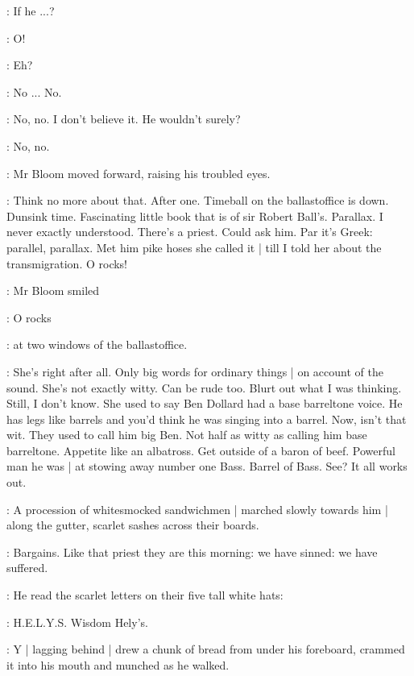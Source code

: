 \BloomInt:
If he ...?

\BloomInt:
O!

\BloomInt:
Eh?

\BloomInt:
No ...
No.

\BloomInt:
No, no.
I don't believe it.
He wouldn't surely?

\BloomInt:
No, no.

:
Mr Bloom moved forward, raising his troubled eyes.

\BloomInt:
Think no more about that.
After one.
Timeball on the ballastoffice is down.
Dunsink time.
Fascinating little book that is of sir Robert Ball's.
Parallax.
I never exactly understood.
There's a priest.
Could ask him.
Par it's Greek:
parallel, parallax.
Met him pike hoses she called it |
till I told her about the transmigration.
O rocks!

:
Mr Bloom smiled

\BloomInt:
O rocks

:
at two windows of the ballastoffice.

\BloomInt:
She's right after all.
Only big words for ordinary things |
on account of the sound.
She's not exactly witty.
Can be rude too.
Blurt out what I was thinking.
Still, I don't know.
She used to say Ben Dollard had a base barreltone voice.
He has legs like barrels and you'd think he was singing into a barrel.
Now, isn't that wit.
They used to call him big Ben.
Not half as witty as calling him base barreltone.
Appetite like an albatross.
Get outside of a baron of beef.
Powerful man he was |
at stowing away number one Bass.
Barrel of Bass.
See?
It all works out.

:
A procession of whitesmocked sandwichmen |
marched slowly towards him |
along the gutter,
scarlet sashes across their boards.

\BloomInt:
Bargains.
Like that priest they are this morning:
we have sinned:
we have suffered.

:
He read the scarlet letters on their five tall white hats:

\BloomInt:
H.E.L.Y.S\@.
Wisdom Hely's.

:
Y |
lagging behind |
drew a chunk of bread from under his foreboard,
crammed it into his mouth
and munched as he walked.

